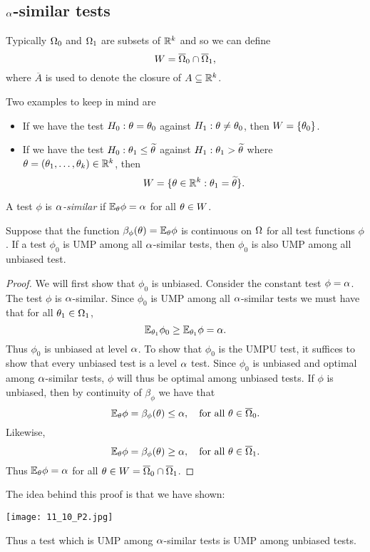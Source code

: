 \subsection{${\alpha}$-similar tests}
Typically ${{\Omega}}_0$ and ${{\Omega}}_1$ are subsets of ${\mathbb R}^k$ and so we can define 
\[W = \overline{{{\Omega}}}_0 \cap \overline{{{\Omega}}}_1, \]
where $\overline{A}$ is used to denote the closure of $A \subseteq {\mathbb R}^k$. 
\begin{exs}
    Two examples to keep in mind are
\begin{itemize}
    \item If we have the test $H_0: {\theta} = {\theta}_0$ against $H_1 : {\theta} \neq {\theta}_0$, then $W = \{{\theta}_0\}$.
    \item If we have the test $H_0 : {\theta}_1 \le \widetilde{{\theta}}$ against $H_1 : {\theta}_1 > \widetilde{{\theta}}$ where ${\theta} = ({\theta}_1,\ldots, {\theta}_k) \in {\mathbb R}^k$, then \[W = \{{\theta} \in {\mathbb R}^k : {\theta}_1 = \widetilde{{\theta}}\}.\]
\end{itemize}
\end{exs}
\begin{defn}
    A test $\phi$ is \emph{${\alpha}$-similar} if ${\mathbb{E}}_{\theta} \phi = {\alpha}$ for all ${\theta} \in W$.
\end{defn}
\begin{lemma}
    Suppose that the function $\beta_\phi({\theta}) = {\mathbb{E}}_{\theta} \phi$ is continuous on ${{\Omega}}$ for all test functions $\phi$. If a test $\phi_0$ is UMP among all ${\alpha}$-similar tests, then $\phi_0$ is also UMP among all unbiased test.
\end{lemma}
\begin{proof}
    We will first show that $\phi_0$ is unbiased. Consider the constant test $\phi = {\alpha}$. The test $\phi$ is ${\alpha}$-similar. Since $\phi_0$ is UMP among all ${\alpha}$-similar tests we must have that for all ${\theta}_1 \in {{\Omega}}_1$,
    \[{\mathbb{E}}_{{\theta}_1}\phi_0 \ge {\mathbb{E}}_{{\theta}_1} \phi = {\alpha}. \]
    Thus $\phi_0$ is unbiased at level ${\alpha}$. To show that $\phi_0$ is the UMPU test, it suffices to show that every unbiased test is a level ${\alpha}$ test. Since $\phi_0$ is unbiased and optimal among ${\alpha}$-similar tests, $\phi$ will thus be optimal among unbiased tests. If $\phi$ is unbiased, then by continuity of $\beta_\phi$ we have that 
    \[{\mathbb{E}}_{{\theta}} \phi = \beta_\phi({\theta}) \le {\alpha},~~~\text{for all } {\theta} \in \overline{{{\Omega}}}_0. \]
    Likewise,
    \[{\mathbb{E}}_{{\theta}} \phi = \beta_\phi({\theta}) \ge {\alpha},~~~\text{for all } {\theta} \in \overline{{{\Omega}}}_1. \]
    Thus ${\mathbb{E}}_{\theta} \phi = {\alpha}$ for all ${\theta} \in W = \overline{{{\Omega}}}_0 \cap \overline{{{\Omega}}}_1$.
\end{proof}
The idea behind this proof is that we have shown:
\begin{center}
    \texttt{[image: 11\_10\_P2.jpg]}
\end{center}
Thus a test which is UMP among ${\alpha}$-similar tests is UMP among unbiased tests.

